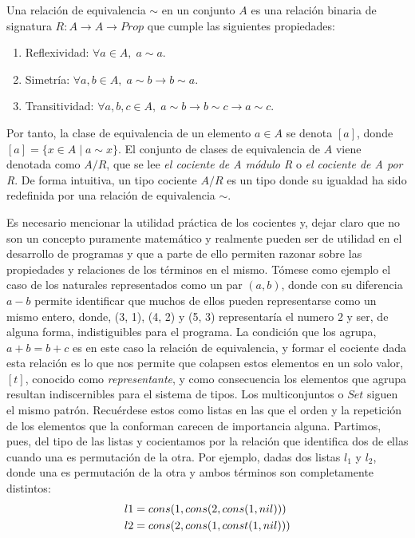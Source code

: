 \begin{definition} Una relación de equivalencia $\sim$ en un conjunto $A$ es una relaci\'on binaria de signatura $R : A \to A \to Prop$ que cumple las siguientes propiedades:
  \begin{enumerate}
    \item Reflexividad: $\forall a \in A, \; a \sim a$.
    \item Simetría: $\forall a, b \in A, \; a \sim b \to b \sim a$.
    \item Transitividad: $\forall a, b, c \in A, \; a \sim b \to b \sim c \to a \sim c$.
  \end{enumerate}
  
  Por tanto, la clase de equivalencia de un elemento $a \in A$ se denota $[a]$, donde $[a] = \{ x \in A \mid a \sim x \}$. El conjunto de clases de equivalencia de $A$ viene denotada como $A/R$, que se lee \textit{el cociente de A módulo R} o \textit{el cociente de A por R}. De forma intuitiva, un tipo cociente $A/R$ es un tipo donde su igualdad ha sido redefinida por una relación de equivalencia $\sim$.
\end{definition}

\indent Es necesario mencionar la utilidad práctica de los cocientes y, dejar claro que no son un concepto puramente matemático y realmente pueden ser de utilidad en el desarrollo de programas y que a parte de ello permiten razonar sobre las propiedades y relaciones de los términos en el mismo. Tómese como ejemplo el caso de los naturales representados como un par $(a, b)$, donde con su diferencia $a - b$ permite identificar que muchos de ellos pueden representarse como un mismo entero, donde, (3, 1), (4, 2) y (5, 3) representaría el numero $2$ y ser, de alguna forma, indistiguibles para el programa. La condición que los agrupa, $a + b = b + c$ es en este caso la relación de equivalencia, y formar el cociente dada esta relación es lo que nos permite que colapsen estos elementos en un solo valor, $[t]$, conocido como \textit{representante}, y como consecuencia los elementos que agrupa resultan indiscernibles para el sistema de tipos.
 \newline 
 \newline 
 \indent Los multiconjuntos o $Set$ siguen el mismo patrón. Recuérdese estos como listas en las que el orden y la repetición de los elementos que la conforman carecen de importancia alguna. Partimos, pues, del tipo de las listas y cocientamos por la relación que identifica dos de ellas cuando una es permutación de la otra. Por ejemplo, dadas dos listas $l_1$ y $l_2$, donde una es permutación de la otra y ambos términos son completamente distintos: 
\begin{align}
& l1 = cons(1, cons(2, cons(1, nil))) \notag \\
& l2 = cons(2, cons(1, const(1, nil))) \notag \\
\end{align}

